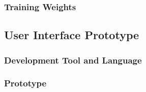\subsubsection{Training Weights}


\subsection{User Interface Prototype} 

\subsubsection{Development Tool and Language}
\subsubsection{Prototype}
\subsubsection{}

\subsection{}

\cleardoublepage